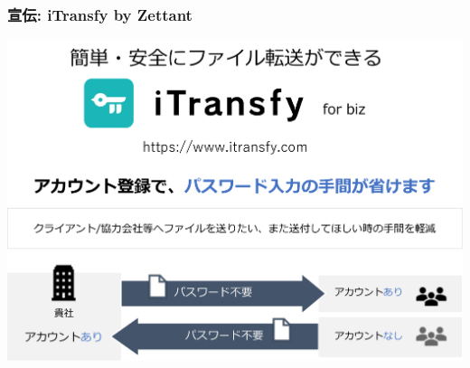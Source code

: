 \begin{frame}
\frametitle{宣伝: iTransfy by Zettant}
\begin{center}
\includegraphics[width=0.9\linewidth]{FigsZettant/itransfy.pdf} 
\end{center}
\end{frame}
